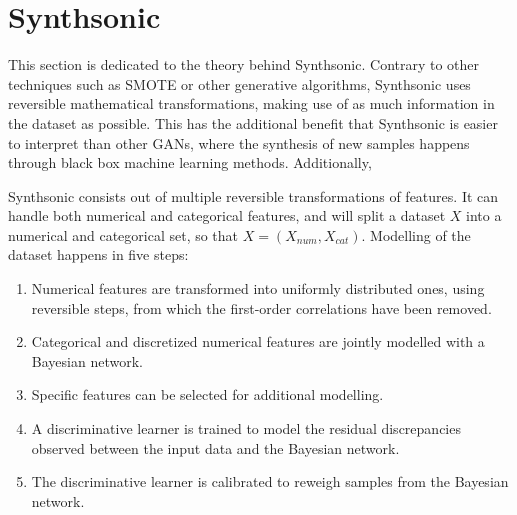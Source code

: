 \section{Synthsonic}
This section is dedicated to the theory behind Synthsonic. Contrary to other techniques such as SMOTE or other generative algorithms, Synthsonic uses reversible mathematical transformations, making use of as much information in the dataset as possible. This has the additional benefit that Synthsonic is easier to interpret than other GANs, where the synthesis of new samples happens through black box machine learning methods. Additionally, 


Synthsonic consists out of multiple reversible transformations of features. It can handle both numerical and categorical features, and will split a dataset $X$ into a numerical and categorical set, so that $X = (X_{num}, X_{cat})$. Modelling of the dataset happens in five steps:

\begin{enumerate}
    \item Numerical features are transformed into uniformly distributed ones, using reversible steps, from which the first-order correlations have been removed.
    \item Categorical and discretized numerical features are jointly modelled with a Bayesian network.
    \item Specific features can be selected for additional modelling.
    \item A discriminative learner is trained to model the residual discrepancies observed between the input data and the Bayesian network.
    \item The discriminative learner is calibrated to reweigh samples from the Bayesian network.
\end{enumerate}

